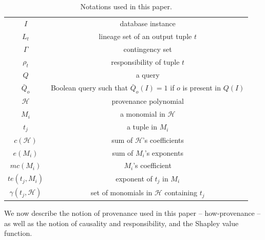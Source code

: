 \documentclass[preprint,12pt,sort&compress]{elsarticle}
\newcommand{\rone}[1]{\textcolor{reviewer1}{#1}}
\begin{document}
\begin{table}[]
    \centering
    \begin{tabular}{c|c}
    \hline
    	 $I$ & database instance \\
    	 $L_t$ & lineage set of an output tuple $t$ \\
    	 $\Gamma$ & contingency set \\
    	 $\rho_t$ & responsibility of tuple $t$ \\
    	 $Q$ & a query \\
    	 $\bar{Q}_{o}$ & Boolean query such that $\bar{Q}_{o}(I) = 1$ if $o$ is present in $Q(I)$ \\
         $\mathcal{H}$ & provenance polynomial  \\
         $M_i$ & a monomial in $\mathcal{H}$ \\
         $t_j$ & a tuple in $M_i$ \\
         $c(\mathcal{H})$ & sum of $\mathcal{H}$'s coefficients \\
         $e(M_i)$ & sum of $M_i$'s exponents \\
         $mc(M_i)$ & $M_i$'s coefficient \\
         $te(t_j, M_i)$ & exponent of $t_j$ in $M_i$ \\
         $\gamma(t_j, \mathcal{H})$ & set of monomials in $\mathcal{H}$ containing $t_j$ \\
    \hline
    \end{tabular}
   \caption{\rone{Notations used in this paper.}}    \label{tab:notation}
\end{table}


We now describe the notion of provenance used in this paper --  how-provenance -- as well as
the notion of causality and responsibility, and the Shapley value function. 

\end{document}
